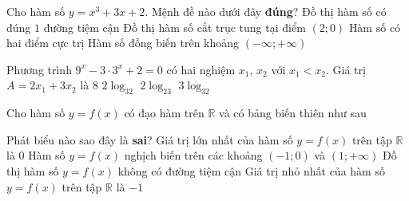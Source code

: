 \begin{ex}%
Cho hàm số $y=x^3+3x+2$. Mệnh đề nào dưới đây \textbf{đúng}?
\choice
{Đồ thị hàm số có đúng $1$ đường tiệm cận}
{Đồ thị hàm số cắt trục tung tại điểm $\left(2;0\right)$}
{Hàm số có hai điểm cực trị}
{\True Hàm số đồng biến trên khoảng $\left(-\infty;+\infty \right)$}
\end{ex}
\begin{ex}%
Phương trình $9^x-3 \cdot 3^x+2=0$ có hai nghiệm $x_1$, $x_2$ với $x_1<x_2$. Giá trị $A=2x_1+3x_2$ là
\choice
{$8$}
{$2\log_32$}
{$2\log_23$}
{\True $3\log_32$}
\end{ex}
\begin{ex}%
Cho hàm số $y=f(x)$ có đạo hàm trên $\mathbb{R}$ và có bảng biến thiên như sau
\begin{center}
\end{center}
Phát biểu nào sao đây là \textbf{sai}?
\choice
{Giá trị lớn nhất của hàm số $y=f(x)$ trên tập $\mathbb{R}$ là $0$}
{Hàm số $y=f(x)$ nghịch biến trên các khoảng $(-1;0)$ và $(1;+\infty)$}
{Đồ thị hàm số $y=f(x)$ không có đường tiệm cận }
{\True Giá trị nhỏ nhất của hàm số $y=f(x)$ trên tập $\mathbb{R}$ là $-1$}
\end{ex}
